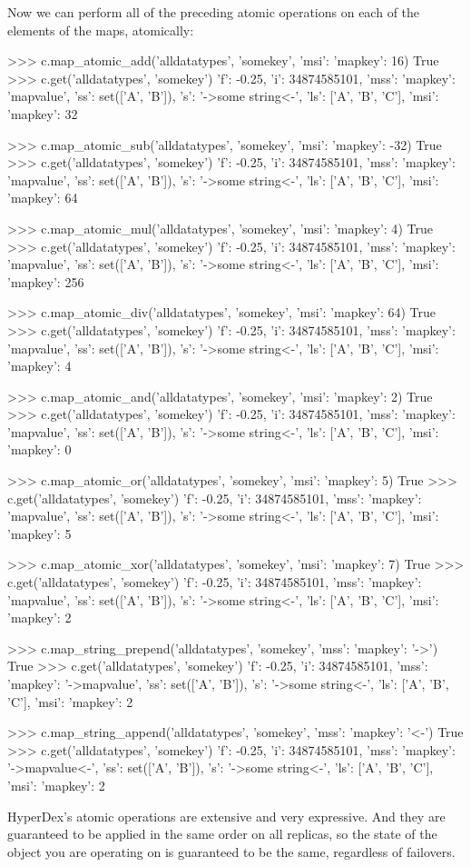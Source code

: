Now we can perform all of the preceding atomic operations on each of the
elements of the maps, atomically:

\begin{pythoncode}
>>> c.map_atomic_add('alldatatypes', 'somekey', {'msi': {'mapkey': 16}})
True
>>> c.get('alldatatypes', 'somekey')
{'f': -0.25, 'i': 34874585101, 'mss': {'mapkey': 'mapvalue'}, 'ss': set(['A', 'B']), 's': '->some string<-', 'ls': ['A', 'B', 'C'], 'msi': {'mapkey': 32}}

>>> c.map_atomic_sub('alldatatypes', 'somekey', {'msi': {'mapkey': -32}})
True
>>> c.get('alldatatypes', 'somekey')
{'f': -0.25, 'i': 34874585101, 'mss': {'mapkey': 'mapvalue'}, 'ss': set(['A', 'B']), 's': '->some string<-', 'ls': ['A', 'B', 'C'], 'msi': {'mapkey': 64}}

>>> c.map_atomic_mul('alldatatypes', 'somekey', {'msi': {'mapkey': 4}})
True
>>> c.get('alldatatypes', 'somekey')
{'f': -0.25, 'i': 34874585101, 'mss': {'mapkey': 'mapvalue'}, 'ss': set(['A', 'B']), 's': '->some string<-', 'ls': ['A', 'B', 'C'], 'msi': {'mapkey': 256}}

>>> c.map_atomic_div('alldatatypes', 'somekey', {'msi': {'mapkey': 64}})
True
>>> c.get('alldatatypes', 'somekey')
{'f': -0.25, 'i': 34874585101, 'mss': {'mapkey': 'mapvalue'}, 'ss': set(['A', 'B']), 's': '->some string<-', 'ls': ['A', 'B', 'C'], 'msi': {'mapkey': 4}}

>>> c.map_atomic_and('alldatatypes', 'somekey', {'msi': {'mapkey': 2}})
True
>>> c.get('alldatatypes', 'somekey')
{'f': -0.25, 'i': 34874585101, 'mss': {'mapkey': 'mapvalue'}, 'ss': set(['A', 'B']), 's': '->some string<-', 'ls': ['A', 'B', 'C'], 'msi': {'mapkey': 0}}

>>> c.map_atomic_or('alldatatypes', 'somekey', {'msi': {'mapkey': 5}})
True
>>> c.get('alldatatypes', 'somekey')
{'f': -0.25, 'i': 34874585101, 'mss': {'mapkey': 'mapvalue'}, 'ss': set(['A', 'B']), 's': '->some string<-', 'ls': ['A', 'B', 'C'], 'msi': {'mapkey': 5}}

>>> c.map_atomic_xor('alldatatypes', 'somekey', {'msi': {'mapkey': 7}})
True
>>> c.get('alldatatypes', 'somekey')
{'f': -0.25, 'i': 34874585101, 'mss': {'mapkey': 'mapvalue'}, 'ss': set(['A', 'B']), 's': '->some string<-', 'ls': ['A', 'B', 'C'], 'msi': {'mapkey': 2}}

>>> c.map_string_prepend('alldatatypes', 'somekey', {'mss': {'mapkey': '->'}})
True
>>> c.get('alldatatypes', 'somekey')
{'f': -0.25, 'i': 34874585101, 'mss': {'mapkey': '->mapvalue'}, 'ss': set(['A', 'B']), 's': '->some string<-', 'ls': ['A', 'B', 'C'], 'msi': {'mapkey': 2}}

>>> c.map_string_append('alldatatypes', 'somekey', {'mss': {'mapkey': '<-'}})
True
>>> c.get('alldatatypes', 'somekey')
{'f': -0.25, 'i': 34874585101, 'mss': {'mapkey': '->mapvalue<-'}, 'ss': set(['A', 'B']), 's': '->some string<-', 'ls': ['A', 'B', 'C'], 'msi': {'mapkey': 2}}
\end{pythoncode}

HyperDex's atomic operations are extensive and very expressive. And they are
guaranteed to be applied in the same order on all replicas, so the state of the
object you are operating on is guaranteed to be the same, regardless of
failovers.
